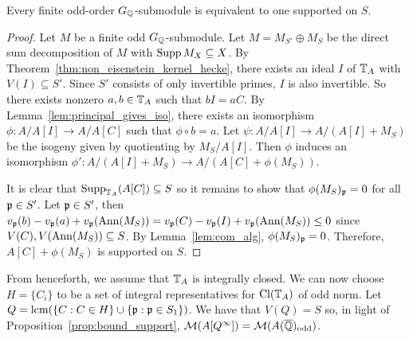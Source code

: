 \begin{proposition}%
    \label{prop:bound_support}
    Every finite odd-order $G_{\mathbb{Q}}$-submodule is equivalent to one supported on
    $S$.
\end{proposition}
\begin{proof}
    Let $M$ be a finite odd $G_{\mathbb{Q}}$-submodule. Let $M=M_{S'}\oplus M_S$ be the
    direct sum decomposition of $M$ with $\operatorname{Supp} M_X \subseteq X$. By
    Theorem~\ref{thm:non_eisenstein_kernel_hecke}, there exists an ideal
    $I$ of $\mathbb{T}_A$ with $V(I)\subseteq S'$. Since $S'$ consists of only
    invertible primes, $I$ is also invertible. So there exists nonzero $a,b\in
    \mathbb{T}_A$ such that $bI=aC$. By Lemma~\ref{lem:principal_gives_iso}, there
    exists an isomorphism $\phi:A/A[I]\to A/A[C]$ such that $\phi\circ b = a$.
    Let $\psi:A/A[I]\to A/(A[I]+M_S)$ be the isogeny given by quotienting by
    $M_S/A[I]$. Then $\phi$ induces an isomorphism $\phi':A/(A[I]+M_S)\to
    A/(A[C]+\phi(M_S))$.

    It is clear that $\operatorname{Supp}_{\mathbb{T}_A}(A[C])\subseteq S$ so it remains to show
    that $\phi(M_S)_{\mathfrak{p}} =0$ for all $\mathfrak{p} \in S'$. Let $\mathfrak{p}\in S'$, then
    $v_{\mathfrak{p}}(b)-v_{\mathfrak{p}}(a)+v_{\mathfrak{p}}(\operatorname{Ann}(M_S))=v_{\mathfrak{p}}(C)-v_{\mathfrak{p}}(I)+v_{\mathfrak{p}}(\operatorname{Ann}(M_S)) \leq 0$
    since $V(C),V(\operatorname{Ann}(M_S))\subseteq S$. By Lemma~\ref{lem:com_alg},
    $\phi(M_S)_{\mathfrak{p}} = 0$. Therefore, $A[C]+\phi(M_S)$ is supported on $S$.
\end{proof}

From henceforth, we assume that $\mathbb{T}_A$ is integrally closed. We can now choose
$H=\{C_i\}$ to be a set of integral representatives for $\operatorname{Cl}(\mathbb{T}_A)$ of odd
norm. Let $Q=\operatorname{lcm}(\{C:C\in H\}\cup \{\mathfrak{p}:\mathfrak{p}\in S_1\})$. We have that $V(Q)=S$
so, in light of Proposition~\ref{prop:bound_support},
$\mathcal{M}(A[Q^\infty])=\mathcal{M}(A(\overline{\mathbb{Q}})_{\mathrm{odd}})$.

